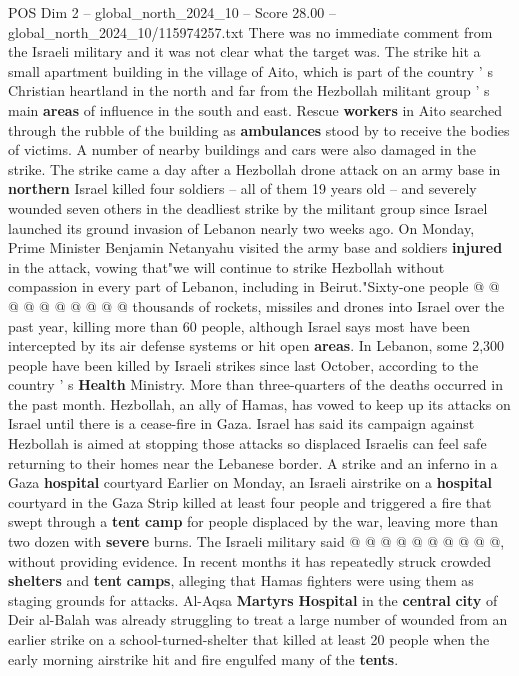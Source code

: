 \begin{textsample}{POS Dim 2 – global\_north\_2024\_10 – Score 28.00 – global\_north\_2024\_10/115974257.txt}  \label{ex:f2_pos_349}
There was no immediate comment from the Israeli military and it was not clear what the target was.
The strike hit a small apartment building in the village of Aito, which is part of the country ' s Christian heartland in the north and far from the Hezbollah militant group ' s main \textbf{areas} of influence in the south and east.
Rescue \textbf{workers} in Aito searched through the rubble of the building as \textbf{ambulances} stood by to receive the bodies of victims.
A number of nearby buildings and cars were also damaged in the strike.
The strike came a day after a Hezbollah drone attack on an army base in \textbf{northern} Israel killed four soldiers -- all of them 19 years old -- and severely wounded seven others in the deadliest strike by the militant group since Israel launched its ground invasion of Lebanon nearly two weeks ago.
On Monday, Prime Minister Benjamin Netanyahu visited the army base and soldiers \textbf{injured} in the attack, vowing that"we will continue to strike Hezbollah without compassion in every part of Lebanon, including in Beirut."Sixty-one people @ @ @ @ @ @ @ @ @ @ thousands of rockets, missiles and drones into Israel over the past year, killing more than 60 people, although Israel says most have been intercepted by its air defense systems or hit open \textbf{areas}.
In Lebanon, some 2,300 people have been killed by Israeli strikes since last October, according to the country ' s \textbf{Health} Ministry.
More than three-quarters of the deaths occurred in the past month.
Hezbollah, an ally of Hamas, has vowed to keep up its attacks on Israel until there is a cease-fire in Gaza.
Israel has said its campaign against Hezbollah is aimed at stopping those attacks so displaced Israelis can feel safe returning to their homes near the Lebanese border.
A strike and an inferno in a Gaza \textbf{hospital} courtyard Earlier on Monday, an Israeli airstrike on a \textbf{hospital} courtyard in the Gaza Strip killed at least four people and triggered a fire that swept through a \textbf{tent} \textbf{camp} for people displaced by the war, leaving more than two dozen with \textbf{severe} burns.
The Israeli military said @ @ @ @ @ @ @ @ @ @, without providing evidence.
In recent months it has repeatedly struck crowded \textbf{shelters} and \textbf{tent} \textbf{camps}, alleging that Hamas fighters were using them as staging grounds for attacks.
Al-Aqsa \textbf{Martyrs} \textbf{Hospital} in the \textbf{central} \textbf{city} of Deir al-Balah was already struggling to treat a large number of wounded from an earlier strike on a school-turned-shelter that killed at least 20 people when the early morning airstrike hit and fire engulfed many of the \textbf{tents}.

\end{textsample}
